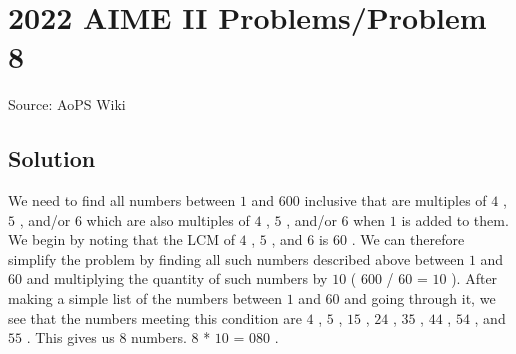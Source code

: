 \documentclass[12pt]{article}
\begin{document}
\section*{{2022 AIME II Problems/Problem 8}}
Source: AoPS Wiki

\subsection*{Solution}
We need to find all numbers between $1$ and $600$ inclusive that are multiples of $4$ , $5$ , and/or $6$ which are also multiples of $4$ , $5$ , and/or $6$ when $1$ is added to them. We begin by noting that the LCM of $4$ , $5$ , and $6$ is $60$ . We can therefore simplify the problem by finding all such numbers described above between $1$ and $60$ and multiplying the quantity of such numbers by $10$ ( $600$ / $60$ = $10$ ). After making a simple list of the numbers between $1$ and $60$ and going through it, we see that the numbers meeting this condition are $4$ , $5$ , $15$ , $24$ , $35$ , $44$ , $54$ , and $55$ . This gives us $8$ numbers. $8$ * $10$ = $\boxed{080}$ .
\end{document}
